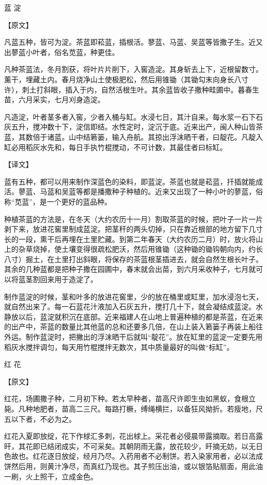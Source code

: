 \documentclass[12pt,UTF8]{ctexbook}
\begin{document}
蓝 淀

【原文】

凡蓝五种，皆可为淀。茶蓝即菘蓝，插根活。蓼蓝、马蓝、吴蓝等皆撒子生。近又出蓼蓝小叶者，俗名苋蓝，种更佳。

凡种茶蓝法，冬月割获，将叶片片削下，入窖造淀。其身斩去上下，近根留数寸。薰干，埋藏土内。春月烧净山土使极肥松，然后用锥锄（其锄勾末向身长八寸许），刺土打斜眼，插入于内，自然活根生叶。其余蓝皆收子撒种畦圃中。暮春生苗，六月采实，七月刈身造淀。

凡造淀，叶者茎多者入窖，少者入桶与缸。水浸七日，其汁自来。每水浆一石下石灰五升，搅冲数十下，淀信即结。水性定时，淀沉于底。近来出产，闽人种山皆茶蓝，其数倍于诸蓝。山中结箬篓，输入舟航。其掠出浮沫晒干者，曰靛花。凡靛入缸必用稻灰水先和，每日手执竹棍搅动，不可计数，其最佳者曰标缸。

【译文】

蓝有五种，都可以用来制作深蓝色的染料，即蓝淀。茶蓝也就是菘蓝，扦插就能成活。蓼蓝、马蓝和吴蓝等都是播撒种子种植的。近来又出现了一种小叶的蓼蓝，俗称“苋蓝”，是一个更好的蓝品种。

种植茶蓝的方法是，在冬天（大约农历十一月）割取茶蓝的时候，把叶子一片一片剥下来，放进花窖里制成蓝淀。把茎秆的两头切掉，只在靠近根部的地方留下几寸长的一段，熏干后再埋在土里贮藏。到第二年春天（大约农历二月）时，放火将山上的杂草烧掉，使土壤变得很疏松肥沃，然后用锥锄（这种锄的锄钩朝向内，约长八寸）掘土，在土里打出斜眼，将保存的茶蓝根茎插进去，就会自然生根长叶子。其余的几种蓝都是把种子撒在园圃中，春末就会出苗，到六月采收种子，七月就可以将蓝茎割回来用于造淀了。

制作蓝淀的时候，茎和叶多的放进花窖里，少的放在桶里或缸里，加水浸泡七天，就自然出来了。每一石蓝花汁液加入石灰五升，搅打几十下，就会凝结成蓝淀。水静放以后，蓝淀就积沉在底部。近来福建人在山地上普遍种植的都是茶蓝，在近来的出产中，茶蓝的数量比其他蓝的总和还要多几倍，在山上装入箬篓子再装上船往外运。制作蓝淀时，把撇出的浮沫晒干后就叫“靛花”。放在缸里的蓝淀一定要先用稻灰水搅拌调匀，每天用竹棍搅拌无数次，其中质量最好的叫做“标缸”。

红 花

【原文】

红花，场圃撒子种，二月初下种。若太早种者，苗高尺许即生虫如黑蚁，食根立毙。凡种地肥者，苗高二三尺。每路打橛，缚绳横拦，以备狂风拗折。若瘦地，尺五以下者，不必为之。

红花入夏即放绽，花下作梂汇多刺，花出梂上。采花者必侵晨带露摘取。若日高露旰，其花即已结闭成实，不可采矣。其朝阴雨无露，放花较少，旰摘无妨，以无日色故也。红花逐日放绽，经月乃尽。入药用者不必制饼。若入染家用者，必以法成饼然后用，则黄汁净尽，而真红乃现也。其子煎压出油，或以银箔贴扇面，用此油一刷，火上照干，立成金色。
\end{document}
